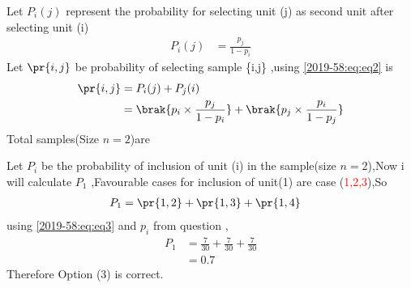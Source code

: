 Let $P_{i}(j)$ represent the probability for selecting unit (j) as second unit after selecting  unit (i) 
\begin{align}
    P_{i}(j)&=\frac{p_{j}}{1-p_{i}}
    \label{2019-58:eq:eq2}
\end{align}
Let  $\pr{i,j}$ be probability of selecting sample \{i,j\} ,using \eqref{2019-58:eq:eq2}  is 
\begin{align}
    \pr{i,j}&=P_{i}(j)+P_{j}(i)
    \\
    &=\brak{p_{i}\times \frac{p_{j}}{1-p_{i}}} + \brak{p_{j}\times \frac{p_{i}}{1-p_{j}}}
    \label{2019-58:eq:eq3}
\end{align}
Total samples(Size $n=2$)are 
\begin{table}[h!]
  \caption{ list of samples}
  \label{2019-58:tab:label1_test}
\end{table}
Let $P_{i}$ be the probability of inclusion of unit (i) in the sample(size $n=2$),Now i will calculate $P_{1}$ ,Favourable cases for inclusion of unit(1) are case (\textcolor{red}{1,2,3}),So
\begin{align}
    P_{1}&=\pr{1,2} +\pr{1,3}+\pr{1,4}
\end{align}
using \eqref{2019-58:eq:eq3} and $p_{i}$ from question ,
\begin{align}
    P_{1}&=\frac{7}{30} + \frac{7}{30} + \frac{7}{30}
    \\
    &=0.7
\end{align}
Therefore Option (3) is correct.
